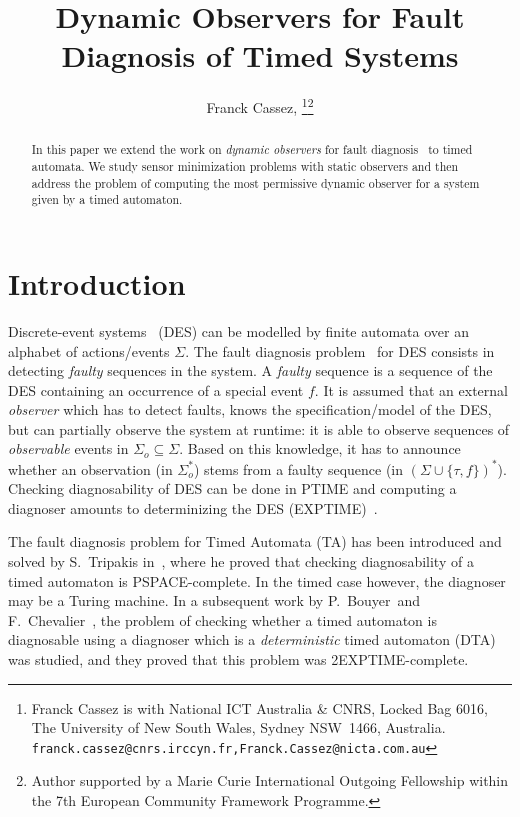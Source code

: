 \documentclass[letterpaper,10pt,conference]{ieeeconf}  \IEEEoverridecommandlockouts                              \overrideIEEEmargins
\title{\LARGE \bf Dynamic Observers for Fault Diagnosis of Timed
  Systems}
\author{Franck Cassez, \IEEEmembership{Member, IEEE}\thanks{Franck Cassez is with National ICT Australia \& CNRS, Locked
    Bag 6016, The University of New South Wales, Sydney NSW~1466,
    Australia. \texttt{\scriptsize
      franck.cassez@cnrs.irccyn.fr,Franck.Cassez@nicta.com.au}}\thanks{Author supported by a Marie Curie International Outgoing
    Fellowship within the 7th European Community Framework Programme.}
}
\def\tauac{\tau}
\begin{document}
\maketitle
  
\thispagestyle{empty}

\begin{abstract} 
  In this paper we extend the work on \emph{dynamic ob\-servers} for
  fault diagnosis~\cite{cassez-acsd-07,cassez-tase-07,cassez-fi-08} to
  timed automata. We study sensor minimization problems with static
  observers and then address the problem of computing the most
  permissive dynamic observer for a system given by a timed automaton.
\end{abstract}

\section{Introduction}


Discrete-event systems~\cite{RW87} (DES) can be modelled by finite
automata over an alphabet of actions/events $\Sigma$.  The fault
diagnosis problem~\cite{Raja95} for DES consists in detecting
\emph{faulty} sequences in the system.
A \emph{faulty} sequence is a sequence of the DES containing an
occurrence of a special event $f$.  It is assumed that an external
\emph{observer} which has to detect faults, knows the
specification/model of the DES, but can partially observe the system
at runtime: it is able to observe sequences of \emph{observable}
events in $\Sigma_o \subseteq \Sigma$.  Based on this knowledge, it
has to announce whether an observation (in $\Sigma_o^*$) stems from a
faulty sequence (in $(\Sigma \cup \{\tauac,f\})^*$). Checking diagnosability of DES can be done in PTIME and computing a
diagnoser amounts to determinizing the DES
(EXPTIME)~\cite{Raja95,Jiang-01,yoo-lafortune-tac-02}.
\smallskip

The fault diagnosis problem for Timed Automata (TA) has been
introduced and solved by S.~Tripakis in~\cite{tripakis-02}, where he
proved that checking {diagnosability} of a timed automaton is
PSPACE-complete.  In the timed case however, the diagnoser may be a
Turing machine.  In a subsequent work by P.~Bouyer~and
F.~Chevalier~\cite{Bouyerfossacs05}, the problem of checking whether a
timed automaton is diagnosable using a diagnoser which is a
\emph{deterministic} timed automaton (DTA) was studied, and they
proved that this problem was 2EXPTIME-complete.
\smallskip
\end{document}

